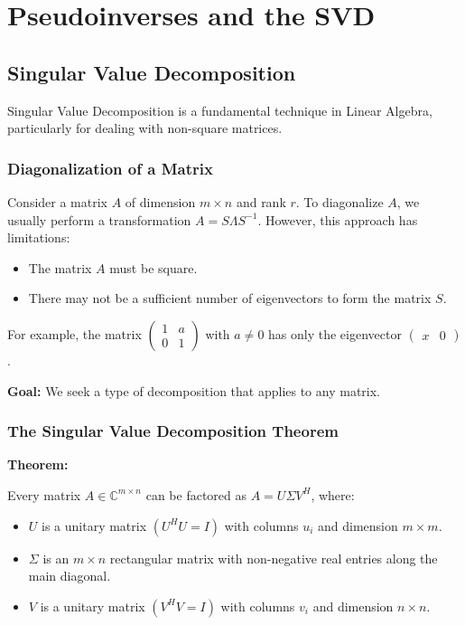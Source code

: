 \chapter{Pseudoinverses and the SVD}

\section{Singular Value Decomposition}

Singular Value Decomposition is a fundamental technique in Linear Algebra, particularly for dealing with non-square matrices.

\subsection{Diagonalization of a Matrix}
Consider a matrix \( A \) of dimension \( m \times n \) and rank \( r \). To diagonalize \( A \), we usually perform a transformation \( A = S\Lambda S^{-1} \). However, this approach has limitations:
\begin{itemize}
    \item The matrix \( A \) must be square.
    \item There may not be a sufficient number of eigenvectors to form the matrix \( S \).
\end{itemize}

For example, the matrix 
\( \begin{pmatrix}
1 & a \\
0 & 1
\end{pmatrix} \)
with \( a \neq 0 \) has only the eigenvector \( \begin{pmatrix} x & 0 \end{pmatrix} \).

\textbf{Goal:} We seek a type of decomposition that applies to any matrix.

\subsection{The Singular Value Decomposition Theorem}

\textbf{Theorem:}

Every matrix \( A \in \mathbb{C}^{m \times n} \) can be factored as \( A = U\Sigma V^H \), where:
\begin{itemize}
    \item \( U \) is a unitary matrix \( (U^H U = I) \) with columns \( u_i \) and dimension \( m \times m \).
    \item \( \Sigma \) is an \( m \times n \) rectangular matrix with non-negative real entries along the main diagonal.
    \item \( V \) is a unitary matrix \( (V^H V = I) \) with columns \( v_i \) and dimension \( n \times n \).
\end{itemize}


